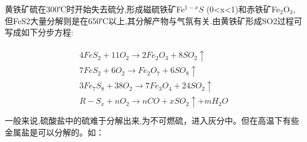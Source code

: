 \documentclass[10pt,openany]{ctexbook}
\begin{document}
黄铁矿硫在300℃时开始失去硫分,形成磁硫铁矿Fe$^{1-x}S$
   (0<x<1)和赤铁矿Fe$_2$O$_3$,但FeS2大量分解则是在650℃以上,其分解产物与气氛有关.由黄铁矿形成SO2过程可写成如下分步方程:

\begin{eqnarray}
\begin{split}
           4FeS_2+11O_2→2Fe_2O_3+8SO_2↑\\
  7FeS_2+6O_2→Fe_2O_7+6SO_8↑\\
  3Fe_7S_8+38O_2→7Fe_3O_4+24SO_2↑\\
  R-S_x+nO_2→nCO+xSO_2↑+mH_2O\\
  \end{split}
\end{eqnarray}
一般来说,硫酸盐中的硫难于分解出来,为不可燃硫，进入灰分中。但在高温下有些金属盐是可以分解的。如：
\end{document}
